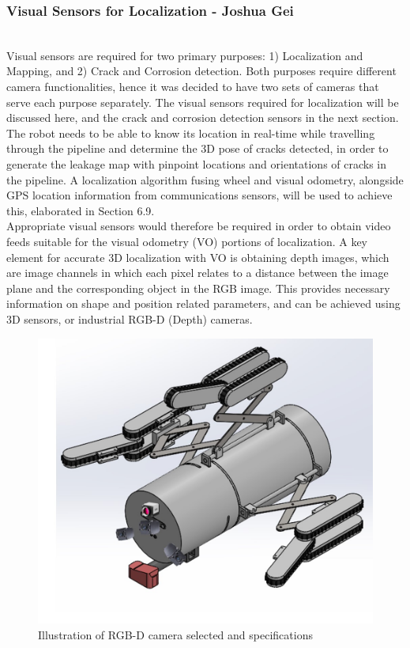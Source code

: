 \documentclass[11pt]{article}		%
\begin{document}
    	        \subsubsection{Visual Sensors for Localization - Joshua Gei}
	        \\Visual sensors are required for two primary purposes: 1) Localization and Mapping, and 2) Crack and Corrosion detection. Both purposes require different camera functionalities, hence it was decided to have two sets of cameras that serve each purpose separately. The visual sensors required for localization will be discussed here, and the crack and corrosion detection sensors in the next section. 
	        \\ \hspace*{3ex}The robot needs to be able to know its location in real-time while travelling through the pipeline and determine the 3D pose of cracks detected, in order to generate the leakage map with pinpoint locations and orientations of cracks in the pipeline. A localization algorithm fusing wheel and visual odometry, alongside GPS location information from communications sensors, will be used to achieve this, elaborated in Section 6.9.
            \\ \hspace*{3ex}Appropriate visual sensors would therefore be required in order to obtain video feeds suitable for the visual odometry (VO) portions of localization. A key element for accurate 3D localization with VO is obtaining depth images, which are image channels in which each pixel relates to a distance between the image plane and the corresponding object in the RGB image. This provides necessary information on shape and position related parameters, and can be achieved using 3D sensors, or industrial RGB-D (Depth) cameras.
	        \begin{figure}[h]
				\centering
				\includegraphics[width=\textwidth]{3dcamera.jpg}
				\caption{Illustration of RGB-D camera selected and specifications}
				\label{robotcamera}
			\end{figure}
\end{document}
